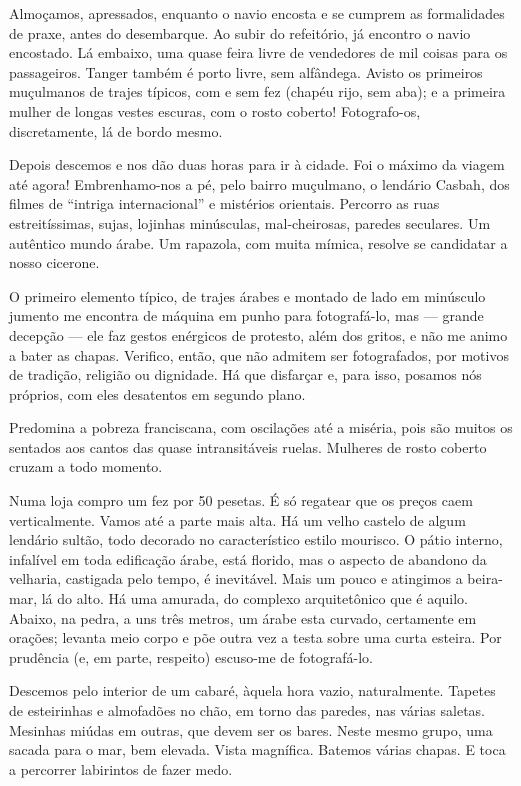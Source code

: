 Almoçamos, apressados, enquanto o navio encosta e se cumprem as formalidades de praxe, antes do desembarque. Ao subir do refeitório, já encontro o navio encostado. Lá embaixo, uma quase feira livre de vendedores de mil coisas para os passageiros. Tanger também é porto livre, sem alfândega. Avisto os primeiros muçulmanos de trajes típicos, com e sem fez (chapéu rijo, sem aba); e a primeira mulher de longas vestes escuras, com o rosto coberto! Fotografo-os, discretamente, lá de bordo mesmo.

Depois descemos e nos dão duas horas para ir à cidade. Foi o máximo da viagem até agora! Embrenhamo-nos a pé, pelo bairro muçulmano, o lendário Casbah, dos filmes de ``intriga internacional'' e mistérios orientais. Percorro as ruas estreitíssimas, sujas, lojinhas minúsculas, mal-cheirosas, paredes seculares. Um autêntico mundo árabe. Um rapazola, com muita mímica, resolve se candidatar a nosso cicerone.

O primeiro elemento típico, de trajes árabes e montado de lado em minúsculo jumento me encontra de máquina em punho para fotografá-lo, mas --- grande decepção --- ele faz gestos enérgicos de protesto, além dos gritos, e não me animo a bater as chapas. Verifico, então, que não admitem ser fotografados, por motivos de tradição, religião ou dignidade. Há que disfarçar e, para isso, posamos nós próprios, com eles desatentos em segundo plano.

Predomina a pobreza franciscana, com oscilações até a miséria, pois são muitos os sentados aos cantos das quase intransitáveis ruelas. Mulheres de rosto coberto cruzam a todo momento.

Numa loja compro um fez por 50 pesetas. É só regatear que os preços caem verticalmente. Vamos até a parte mais alta. Há um velho castelo de algum lendário sultão, todo decorado no característico estilo mourisco. O pátio interno, infalível em toda edificação árabe, está florido, mas o aspecto de abandono da velharia, castigada pelo tempo, é inevitável. Mais um pouco e atingimos a beira-mar, lá do alto. Há uma amurada, do complexo arquitetônico que é aquilo. Abaixo, na pedra, a uns três metros, um árabe esta curvado, certamente em orações; levanta meio corpo e põe outra vez a testa sobre uma curta esteira. Por prudência (e, em parte, respeito) escuso-me de fotografá-lo.

Descemos pelo interior de um cabaré, àquela hora vazio, naturalmente. Tapetes de esteirinhas e almofadões no chão, em torno das paredes, nas várias saletas. Mesinhas miúdas em outras, que devem ser os bares. Neste mesmo grupo, uma sacada para o mar, bem elevada. Vista magnífica. Batemos várias chapas. E toca a percorrer labirintos de fazer medo.

